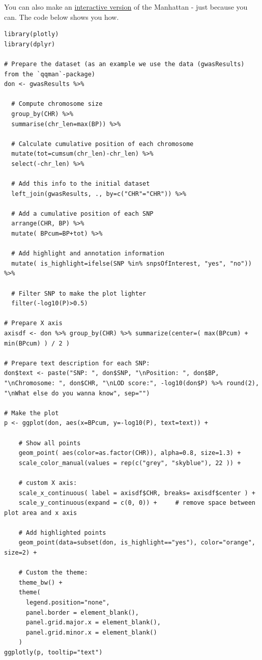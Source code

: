\documentclass[
]{book}
\begin{document}
You can also make an \href{https://r-graph-gallery.com/101_Manhattan_plot.html}{interactive version} of the Manhattan - just because you can. The code below shows you how.

\begin{lstlisting}
library(plotly)
library(dplyr)

# Prepare the dataset (as an example we use the data (gwasResults) from the `qqman`-package)
don <- gwasResults %>%

  # Compute chromosome size
  group_by(CHR) %>%
  summarise(chr_len=max(BP)) %>%

  # Calculate cumulative position of each chromosome
  mutate(tot=cumsum(chr_len)-chr_len) %>%
  select(-chr_len) %>%

  # Add this info to the initial dataset
  left_join(gwasResults, ., by=c("CHR"="CHR")) %>%

  # Add a cumulative position of each SNP
  arrange(CHR, BP) %>%
  mutate( BPcum=BP+tot) %>%

  # Add highlight and annotation information
  mutate( is_highlight=ifelse(SNP %in% snpsOfInterest, "yes", "no")) %>%

  # Filter SNP to make the plot lighter
  filter(-log10(P)>0.5)

# Prepare X axis
axisdf <- don %>% group_by(CHR) %>% summarize(center=( max(BPcum) + min(BPcum) ) / 2 )

# Prepare text description for each SNP:
don$text <- paste("SNP: ", don$SNP, "\nPosition: ", don$BP, "\nChromosome: ", don$CHR, "\nLOD score:", -log10(don$P) %>% round(2), "\nWhat else do you wanna know", sep="")

# Make the plot
p <- ggplot(don, aes(x=BPcum, y=-log10(P), text=text)) +

    # Show all points
    geom_point( aes(color=as.factor(CHR)), alpha=0.8, size=1.3) +
    scale_color_manual(values = rep(c("grey", "skyblue"), 22 )) +

    # custom X axis:
    scale_x_continuous( label = axisdf$CHR, breaks= axisdf$center ) +
    scale_y_continuous(expand = c(0, 0)) +     # remove space between plot area and x axis

    # Add highlighted points
    geom_point(data=subset(don, is_highlight=="yes"), color="orange", size=2) +

    # Custom the theme:
    theme_bw() +
    theme(
      legend.position="none",
      panel.border = element_blank(),
      panel.grid.major.x = element_blank(),
      panel.grid.minor.x = element_blank()
    )
ggplotly(p, tooltip="text")
\end{lstlisting}
\end{document}
